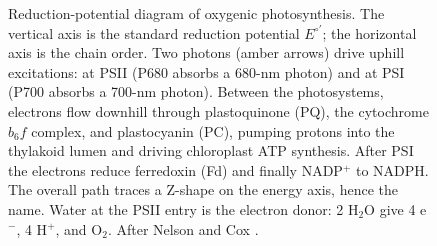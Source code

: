 \begin{figure}[htbp]
\caption[Z-scheme of oxygenic photosynthesis]{Reduction-potential
diagram of oxygenic photosynthesis. The vertical axis is the standard
reduction potential $E^{\circ\prime}$; the horizontal axis is the
chain order. Two photons (amber arrows) drive uphill excitations: at
PSII (P680 absorbs a 680-nm photon) and at PSI (P700 absorbs a 700-nm
photon). Between the photosystems, electrons flow downhill through
plastoquinone (PQ), the cytochrome $b_6 f$ complex, and plastocyanin
(PC), pumping protons into the thylakoid lumen and driving chloroplast
ATP synthesis. After PSI the electrons reduce ferredoxin (Fd) and
finally NADP$^+$ to NADPH. The overall path traces a Z-shape on the
energy axis, hence the name. Water at the PSII entry is the electron
donor: 2 H$_2$O give 4 e$^-$, 4 H$^+$, and O$_2$. After Nelson and Cox
\cite[fig.~19-49]{text:lehninger-biochemistry}.}
\label{fig:vol06:ch02:z-scheme}
\end{figure}
